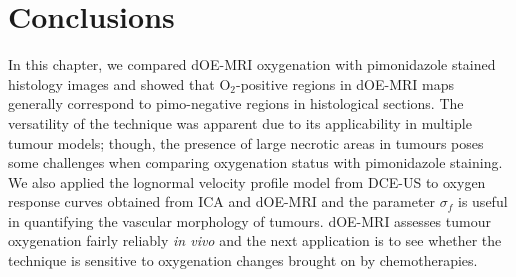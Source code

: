 \section{Conclusions}

In this chapter, we compared \acs{dOE-MRI} oxygenation with pimonidazole stained histology images and showed that O$_2$-positive regions in dOE-MRI maps generally correspond to pimo-negative regions in histological sections. 
The versatility of the technique was apparent due to its applicability in multiple tumour models; though, the presence of large necrotic areas in tumours poses some challenges when comparing oxygenation status with pimonidazole staining.
We also applied the lognormal velocity profile model from \acs{DCE-US} to oxygen response curves obtained from \acs{ICA} and \acs{dOE-MRI} and the parameter $\sigma_f$ is useful in quantifying the vascular morphology of tumours.
\acs{dOE-MRI} assesses tumour oxygenation fairly reliably \emph{in vivo} and the next application is to see whether the technique is sensitive to oxygenation changes brought on by chemotherapies.

%

%

%